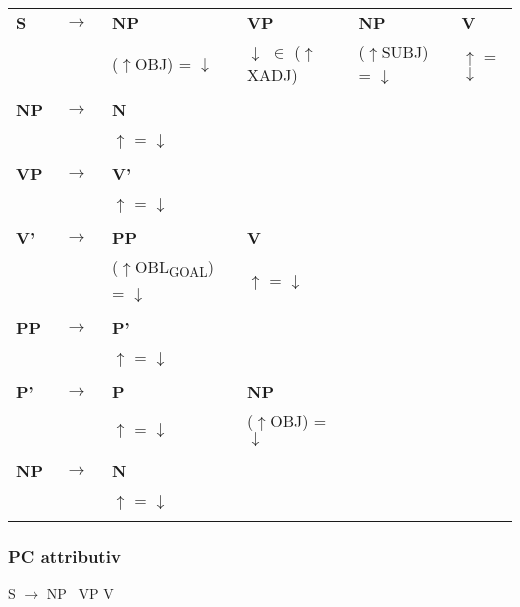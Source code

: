\documentclass[12pt,a4paper]{article}
\begin{document}
\begin{tabular}{ l  l  l  l  l  l }
  \textbf{S} & $\rightarrow$ & \: \: \textbf{NP} & \: \textbf{VP} & \: \: \textbf{NP} & \: \textbf{V}\\
   & $\qquad$ & ($\uparrow$OBJ) = $\downarrow$ & $\downarrow$ $\in$ ($\uparrow$XADJ) & ($\uparrow$SUBJ) = $\downarrow$ & $\uparrow$ = $\downarrow$ \\
   $\qquad$ & $\qquad$ \\
    \textbf{NP} & $\rightarrow$ & \: \textbf{N} \\
   & $\qquad$ & $\uparrow$ = $\downarrow$\\
      $\qquad$ & $\qquad$ \\
    \textbf{VP} & $\rightarrow$ & \: \textbf{V'} \\
   & $\qquad$ & $\uparrow$ = $\downarrow$\\
   $\qquad$ & $\qquad$ \\
    \textbf{V'} & $\rightarrow$ & \: \: \textbf{PP} & \: \: \: \textbf{V} & \\
   & $\qquad$ &($\uparrow$OBL\textsubscript{GOAL}) = $\downarrow$  & \: $\uparrow$ = $\downarrow$\\
   $\qquad$ & $\qquad$ \\
    \textbf{PP} & $\rightarrow$ & \: \: \textbf{P'} \\
	& $\qquad$   & $\uparrow$ = $\downarrow$\\
   $\qquad$ & $\qquad$ \\
    \textbf{P'} & $\rightarrow$ & \: \: \textbf{P} & \: \: \textbf{NP} \\
   & $\qquad$ & $\uparrow$ = $\downarrow$ & ($\uparrow$OBJ) = $\downarrow$ \\
   $\qquad$ & $\qquad$ \\
    \textbf{NP} & $\rightarrow$ & \: \textbf{N} \\
   & $\qquad$ & $\uparrow$ = $\downarrow$\\
      $\qquad$ & $\qquad$ \\     
\end{tabular} 

\subsubsection{PC attributiv}

S $\rightarrow$ NP \, VP \: V\\
\end{document}
